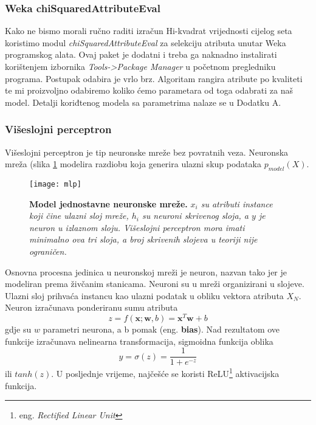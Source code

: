 \subsubsection*{Weka chiSquaredAttributeEval}
Kako ne bismo morali ručno raditi izračun Hi-kvadrat vrijednosti cijelog seta koristimo modul \textit{chiSquaredAttributeEval} za selekciju atributa unutar Weka programskog alata. Ovaj paket je dodatni i treba ga naknadno instalirati korištenjem izbornika \textit{Tools->Package Manager} u početnom pregledniku programa. Postupak odabira je vrlo brz. Algoritam rangira atribute po kvaliteti te mi proizvoljno odabiremo koliko ćemo parametara od toga odabrati za naš model. Detalji koriđtenog modela sa parametrima nalaze se u Dodatku A.

\subsubsection{Višeslojni perceptron}
Višeslojni perceptron je tip neuronske mreže bez povratnih veza. Neuronska mreža (slika \ref{fig:mlp} modelira razdiobu koja generira ulazni skup podataka $p_{model}(X)$.
\begin{figure}[!ht]
    \centering
    \texttt{[image: mlp]}
    \caption[Model jednostavne neuronske mreže]{\textbf{Model jednostavne neuronske mreže.} \textit{$x_i$ su atributi instance koji čine ulazni sloj mreže, $h_i$ su neuroni skrivenog sloja, a $y$ je neuron u izlaznom sloju. Višeslojni perceptron mora imati minimalno ova tri sloja, a broj skrivenih slojeva u teoriji nije ograničen.}}
    \label{fig:mlp}
\end{figure}

Osnovna procesna jedinica u neuronskoj mreži je neuron, nazvan tako jer je modeliran prema živčanim stanicama. Neuroni su u mreži organizirani u slojeve. Ulazni sloj prihvaća instancu kao ulazni podatak u obliku vektora atributa $X_N$. Neuron izračunava ponderiranu sumu atributa
\begin{equation}
    z = f(\textbf{x};\textbf{w},b) = \textbf{x}^T\textbf{w} + b
\end{equation}
gdje su $w$ parametri neurona, a b pomak (eng. \textbf{bias}). 
Nad rezultatom ove funkcije izračunava nelinearna transformacija, sigmoidna funkcija oblika
\begin{equation}
    y = \sigma(z) = \frac{1}{1+e^{-z}}
\end{equation}
ili $tanh(z)$. U posljednje vrijeme, najčešće se koristi ReLU\footnote{eng. \textit{Rectified Linear Unit}} aktivacijska funkcija.

